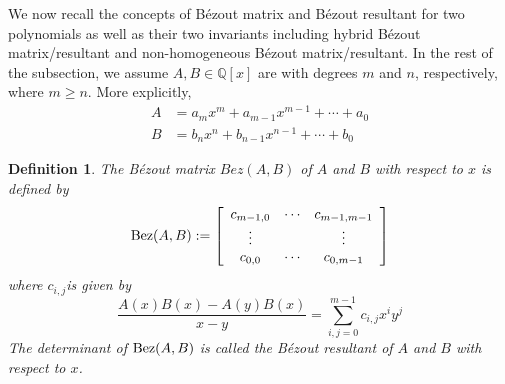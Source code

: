 \documentclass{article}
\newtheorem{definition}[theorem]{Definition}
\begin{document}
We now recall the concepts of B\'ezout matrix  and B\'ezout resultant for two polynomials as well as their two invariants including  hybrid B\'ezout matrix/resultant and non-homogeneous B\'ezout matrix/resultant.
In the rest of the subsection, we assume $A,B\in\mathbb{Q}[x]$ are with degrees $m$ and $n$, respectively, where $m\ge n$. More explicitly,
\begin{align*}
A&=a_mx^m+a_{m-1}x^{m-1}+\cdots+a_0\\
B&=b_nx^n+b_{n-1}x^{n-1}+\cdots+b_0
\end{align*}

\begin{definition}\label{def:bez}
The B\'ezout matrix  $Bez(A,B)$ of $A$ and $B$ with respect to $x$ is defined by
$${\rm{Bez}}(A,{B}): =
\left[
\begin{array}{*{20}{c}}
{c_{m-1,0}}& \cdots &{c_{m-1,m-1}}\\
 \vdots &{}& \vdots \\
c_{0,0}& \cdots &c_{0,m-1}
\end{array} \right]$$
where ${c_{i,j}}$is given by
\begin{equation}\label{eq:cij}
\frac{{{A}(x){B}(x) - {A}(y){B}(x)}}{{x - y}} = \sum\limits_{i,j = 0}^{{m} - 1} {c_{i,j}} {x^{i}}{y^{j}}
\end{equation}
The determinant of ${\rm{Bez}}(A,{B})$ is called the B\'ezout resultant of $A$ and $B$ with respect to $x$.
\end{definition}
\end{document}
